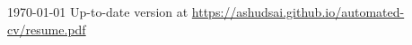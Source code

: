 \documentclass[11pt, a4paper]{awesome-cv}
\begin{document}
\makecvheader[C]

\makecvfooter
{\today}
{Up-to-date version at \upshape\color{text}\url{https://ashudsai.github.io/automated-cv/resume.pdf}}
{\thepage}



\medskip
\vspace{1em}

\vspace{-1em}


\medskip

\end{document}
